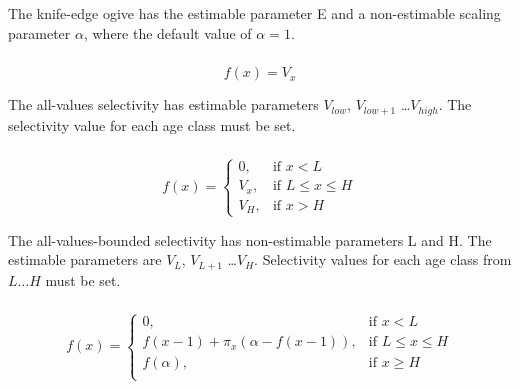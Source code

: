 The knife-edge ogive has the estimable parameter E and a non-estimable scaling parameter $\alpha$, where the default value of $\alpha = 1$.

\subsubsection[All-values]{}

\begin{equation}
f(x)=V_x
\end{equation}

The all-values selectivity has estimable parameters $V_{low}$, $V_{low+1}$ \ldots $V_{high}$. The selectivity value for each age class must be set.

\subsubsection[All-values-bounded]{}

\begin{equation}
f(x)=\begin{cases}
		 0, & \text{if $x < L$} \\
		 V_x, & \text{if $L \le x \le H$} \\
		 V_H, & \text{if $x > H$}
  \end{cases}
\end{equation}

The all-values-bounded selectivity has non-estimable parameters L and H. The estimable parameters are $V_L$, $V_{L+1}$ \ldots $V_H$. Selectivity values for each age class from $L \ldots H$ must be set.

\subsubsection[Increasing]{}

\begin{equation}
f(x)=\begin{cases}
	  0, & \text{if $x < L$} \\
	  f(x-1)+ \pi_x(\alpha-f(x-1)), & \text{if $L \le x \le H$} \\
	  f(\alpha), & \text{if $x \ge H$} \\
  \end{cases}
\end{equation}

